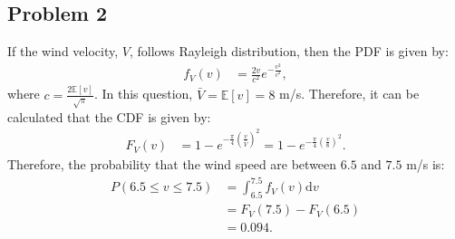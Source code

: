 \subsection*{Problem 2}
If the wind velocity, $V$, follows Rayleigh distribution, then the PDF is given by:
\begin{align*}
	f_V(v) &= \frac{2v}{c^2}e^{-\frac{v^2}{c^2}},
\end{align*}
where $c=\frac{2\mathbb{E}[v]}{\sqrt{\pi}}$. In this question, $\bar{V}=\mathbb{E}[v]=8$ m/s. Therefore, it can be calculated that the CDF is given by:
\begin{align*}
	F_V(v) &= 1-e^{-\frac{\pi}{4}\left(\frac{v}{\bar{V}}\right)^2} = 1-e^{-\frac{\pi}{4}\left(\frac{v}{8}\right)^2}.
\end{align*}
Therefore, the probability that the wind speed are between $6.5$ and $7.5$ m/s is:
\begin{align*}
	P(6.5 \leq v \leq 7.5) &= \int_{6.5}^{7.5}f_V(v)\text{d}v\\
	&= F_V(7.5)-F_V(6.5)\\
	&= 0.094.
\end{align*}
